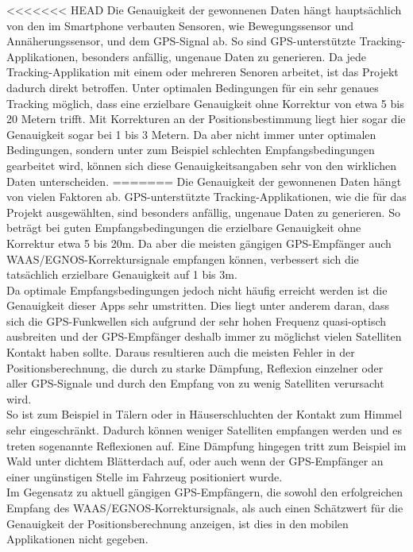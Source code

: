 <<<<<<< HEAD
Die Genauigkeit der gewonnenen Daten hängt hauptsächlich von den im Smartphone verbauten Sensoren, wie Bewegungssensor und Annäherungssensor, und  dem GPS-Signal ab.
So sind GPS-unterstützte Tracking-Applikationen, besonders  anfällig, ungenaue Daten zu generieren.
Da jede Tracking-Applikation mit einem oder mehreren Senoren arbeitet, ist das Projekt dadurch direkt betroffen. 
Unter optimalen Bedingungen für ein sehr genaues Tracking möglich, dass eine erzielbare Genauigkeit ohne Korrektur von etwa 5 bis 20 Metern trifft. 
Mit Korrekturen an der Positionsbestimmung liegt hier sogar die Genauigkeit sogar bei 1 bis 3 Metern.
Da aber nicht immer unter optimalen Bedingungen, sondern unter zum Beispiel schlechten Empfangsbedingungen gearbeitet wird, können sich diese Genauigkeitsangaben sehr von den wirklichen Daten unterscheiden.  
=======
Die Genauigkeit der gewonnenen Daten hängt von vielen Faktoren ab. 
GPS-unterstützte Tracking-Applikationen, wie die für das Projekt ausgewählten, sind besonders  anfällig, ungenaue Daten zu generieren. 
So beträgt bei guten Empfangsbedingungen die erzielbare Genauigkeit ohne Korrektur etwa 5 bis 20m. 
Da aber die meisten gängigen GPS-Empfänger auch WAAS/EGNOS-Korrektursignale empfangen können, verbessert sich die tatsächlich erzielbare Genauigkeit auf 1 bis 3m. \\
Da optimale Empfangsbedingungen jedoch nicht häufig erreicht  werden ist die Genauigkeit dieser Apps sehr umstritten.
Dies liegt unter anderem daran, dass sich die GPS-Funkwellen sich aufgrund der sehr hohen Frequenz quasi-optisch ausbreiten und der GPS-Empfänger deshalb immer zu möglichst vielen Satelliten Kontakt haben sollte. 
Daraus resultieren auch die meisten Fehler in der Positionsberechnung, die durch zu starke Dämpfung, Reflexion einzelner oder aller GPS-Signale und durch den Empfang von zu wenig Satelliten verursacht wird. \\
So ist zum Beispiel in Tälern oder in Häuserschluchten der Kontakt zum Himmel sehr eingeschränkt. 
Dadurch können weniger Satelliten empfangen werden und es treten sogenannte Reflexionen auf. 
Eine Dämpfung hingegen tritt zum Beispiel im Wald unter dichtem Blätterdach auf, oder auch wenn der GPS-Empfänger an einer ungünstigen Stelle im Fahrzeug positioniert wurde. \\
Im Gegensatz zu aktuell gängigen GPS-Empfängern, die sowohl den erfolgreichen Empfang des WAAS/EGNOS-Korrektursignals, als auch einen Schätzwert für die Genauigkeit der Positionsberechnung anzeigen, ist dies in den mobilen Applikationen nicht gegeben. 
